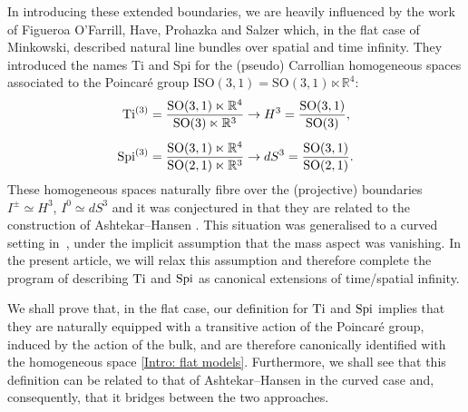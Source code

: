 \documentclass[a4paper, 10pt]{article}
\theoremstyle{remark}
\newcommand{\Ti}{\textnormal{Ti}}
\newcommand{\Spi}{\textnormal{Spi}}
\begin{document}
In introducing these extended boundaries, we are heavily influenced by the work~\cite{Figueroa-OFarrill:2021sxz} of Figueroa O'Farrill, Have, Prohazka and Salzer which, in the flat case of Minkowski, described natural line bundles over spatial and time infinity. They introduced the names Ti and Spi for the (pseudo) Carrollian homogeneous spaces associated to the Poincaré group $\textrm{ISO}(3,1) = \textrm{SO}(3,1) \ltimes \mathbb{R}^{4}$:
\begin{align}\label{Intro: flat models}
\begin{alignedat}{2}
        \Ti^{(3)} = \frac{\textrm{SO}(3,1) \ltimes \mathbb{R}^{4}}{ \textrm{SO}(3) \ltimes \mathbb{R}^{3}} &\to  H^3 = \frac{\textrm{SO}(3,1) }{ \textrm{SO}(3)},\\[0.5em]
        \Spi^{(3)} = \frac{\textrm{SO}(3,1) \ltimes \mathbb{R}^{4}}{ \textrm{SO}(2,1) \ltimes \mathbb{R}^{3}} &\to  dS^3 = \frac{\textrm{SO}(3,1) }{ \textrm{SO}(2,1)}.
\end{alignedat}
\end{align}
These homogeneous spaces naturally fibre over the (projective) boundaries $I^{\pm} \simeq H^3$, $I^{0} \simeq dS^3$ and it was conjectured in \cite{Figueroa-OFarrill:2021sxz} that they are related to the construction of Ashtekar--Hansen \cite{ashtekar_unified_1978}. This situation was generalised to a curved setting in~\cite{RSTA20230042,Borthwick:2024wfn}, under the implicit assumption that the mass aspect was vanishing. In the present article, we will relax this assumption and therefore complete the program of describing $\Ti$ and $\Spi$ as canonical extensions of time/spatial infinity. 

We shall prove that, in the flat case, our definition for $\Ti$ and $\Spi$ implies that they are naturally equipped with a transitive action of the Poincaré group, induced by the action of the bulk, and are therefore canonically identified with the homogeneous space \eqref{Intro: flat models}. Furthermore, we shall see that this definition can be related to that of Ashtekar--Hansen \cite{ashtekar_unified_1978} in the curved case and, consequently, that it bridges between the two approaches.\\
\end{document}

